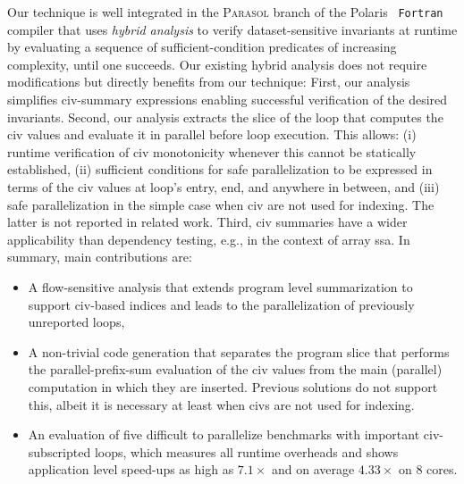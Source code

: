 \documentclass{sig-alternate}
\begin{document}


Our technique is well integrated %
in the \textsc{Parasol} branch of the Polaris~\cite{Blume94automaticdetection} 
{\tt Fortran} compiler that uses {\em hybrid analysis} to
verify dataset-sensitive invariants %
at runtime by evaluating a sequence of sufficient-condition 
predicates of increasing complexity, until one succeeds. 
%
Our existing hybrid analysis does not require modifications
but directly benefits from our technique: 
%
First, our analysis simplifies {\sc civ}-summary expressions
enabling successful verification of the desired invariants.
Second, our analysis extracts the slice of the loop that computes
the {\sc civ} values and evaluate it in parallel before loop
execution. This allows: 
  (i) runtime verification of {\sc civ} monotonicity whenever 
          this cannot be statically established, 
 (ii) sufficient conditions for safe parallelization to 
          be expressed in terms of the {\sc civ} values at loop's 
          entry, end, and anywhere in between, and 
(iii) safe parallelization in the simple case when
        {\sc civ} are not used for indexing.
The latter is not reported in related work.
%
Third, {\sc civ} summaries have a wider applicability than 
dependency testing, e.g., in the context of array {\sc ssa}.
%
In summary, main contributions are:
\begin{itemize}
    \item A flow-sensitive analysis that extends %
            program level summarization to support {\sc civ}-based 
            indices and leads to the parallelization of
            previously unreported loops, 

    \item A non-trivial code generation that separates the 
            program slice that performs the parallel-prefix-sum
            evaluation of the {\sc civ} values 
            from the main (parallel) computation in which 
            they are inserted. Previous solutions do not support this, 
            albeit it is necessary at least when {\sc civ}s are 
            not used for indexing.
            
    \item An evaluation of five difficult to parallelize benchmarks 
            with important {\sc civ}-subscripted loops, which measures 
            all runtime overheads and shows application level speed-ups 
            as high as $7.1\times$ and on average $4.33\times$ on $8$ cores.
%
\end  {itemize}
\end{document}
